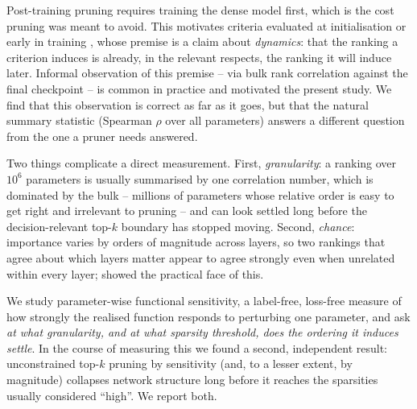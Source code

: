 \documentclass{article}
\begin{document}
Post-training pruning requires training the dense model first, which is the cost pruning
was meant to avoid. This motivates criteria evaluated at initialisation or early in
training \citep{lee2019snip,tanaka2020synflow}, whose premise is a claim about
\emph{dynamics}: that the ranking a criterion induces is already, in the relevant respects,
the ranking it will induce later. Informal observation of this premise -- via bulk rank
correlation against the final checkpoint -- is common in practice and motivated the present
study. %
We find that this observation is correct as far as it goes, but that the natural summary
statistic (Spearman $\rho$ over all parameters) answers a different question from the one a
pruner needs answered.

Two things complicate a direct measurement. First, \emph{granularity}: a ranking over
$10^6$ parameters is usually summarised by one correlation number, which is dominated by
the bulk -- millions of parameters whose relative order is easy to get right and irrelevant
to pruning -- and can look settled long before the decision-relevant top-$k$ boundary has
stopped moving. Second, \emph{chance}: importance varies by orders of magnitude across
layers, so two rankings that agree about which layers matter appear to agree strongly even
when unrelated within every layer; \citet{su2020sanity} showed the practical face of this.

We study parameter-wise functional sensitivity, a label-free, loss-free measure of how
strongly the realised function responds to perturbing one parameter, and ask \emph{at what
granularity, and at what sparsity threshold, does the ordering it induces settle}. In the
course of measuring this we found a second, independent result: unconstrained top-$k$
pruning by sensitivity (and, to a lesser extent, by magnitude) collapses network structure
long before it reaches the sparsities usually considered ``high''. We report both.
\end{document}
